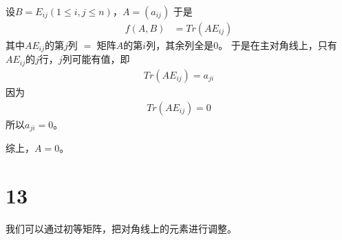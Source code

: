 \documentclass{article}
\begin{document}
设$B = E_{ij} (1 \leq i, j \leq n)$，$A = (a_{ij})$
于是
\begin{align*}
  f(A, B) & = Tr(A E_{ij})
\end{align*}
其中$A E_{ij}$的第$j$列 $ = $ 矩阵$A$的第$i$列，其余列全是0。
于是在主对角线上，只有$A E_{ij}$的$j$行，$j$列可能有值，即
\begin{align*}
  Tr(A E_{ij}) = a_{ji}
\end{align*}
因为
\begin{align*}
  Tr(A E_{ij}) = 0
\end{align*}
所以$a_{ji} = 0$。

综上，$A = 0$。

\section*{13}

我们可以通过初等矩阵，把对角线上的元素进行调整。
\end{document}
